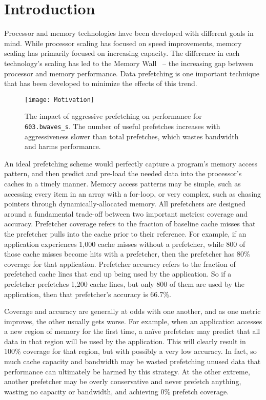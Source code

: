 \section{Introduction}
\label{Introduction}

Processor and memory technologies have been developed with different
goals in mind. While processor scaling has focused on speed
improvements, memory scaling has primarily focused on increasing
capacity. The difference in each technology's scaling has led to the
Memory Wall~\cite{MemWall} -- the increasing gap between processor and
memory performance. Data prefetching is one important technique that
has been developed to minimize the effects of this trend.

\begin{figure}[t]
\texttt{[image: Motivation]}
\caption{The impact of aggressive prefetching on performance for {\tt 603.bwaves\_s}. 
The number of useful prefetches increases with aggressiveness
slower than total prefetches, which wastes bandwidth and 
harms performance.}
\label{Fig:Motivation}
\end{figure}

An ideal prefetching scheme would perfectly capture a program's memory
access pattern, and then predict and pre-load the needed data into the
processor's caches in a timely manner.  Memory access patterns may be
simple, such as accessing every item in an array with a for-loop, or
very complex, such as chasing pointers through dynamically-allocated
memory. All prefetchers are designed around a fundamental trade-off between
two important metrics: coverage and accuracy. Prefetcher coverage
refers to the fraction of baseline cache misses that the prefetcher
pulls into the cache prior to their reference.  For example, if an
application experiences 1,000 cache misses without a prefetcher, while
800 of those cache misses become hits with a prefetcher, then the
prefetcher has 80\% coverage for that application.  Prefetcher
accuracy refers to the fraction of prefetched cache lines that end up
being used by the application. So if a prefetcher prefetches 1,200
cache lines, but only 800 of them are used by the application, then
that prefetcher's accuracy is 66.7\%.

Coverage and accuracy are generally at odds with one another, and as
one metric improves, the other usually gets worse. For example, when
an application accesses a new region of memory for the first time, a
na\"ive prefetcher may predict that all data in that region will be
used by the application.  This will clearly result in 100\% coverage
for that region, but with possibly a very low accuracy.  In fact, so
much cache capacity and bandwidth may be wasted prefetching unused
data that performance can ultimately be harmed by this strategy. At
the other extreme, another prefetcher may be overly conservative and
never prefetch anything, wasting no capacity or bandwidth, and
achieving 0\% prefetch coverage.

